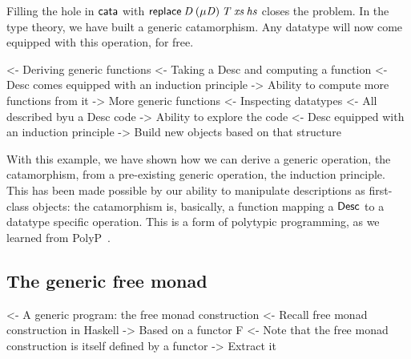 %
Filling the hole in $\F{cata}$ with \(\F{replace}\: \V{D}\:
(\Mu{\V{D}})\: \V{T}\: \V{xs}\: \V{hs}\) closes the problem. In the
type theory, we have built a generic catamorphism. Any datatype will
now come equipped with this operation, for free.


\begin{wstructure}
<- Deriving generic functions
    <- Taking a Desc and computing a function
        <- Desc comes equipped with an induction principle
        -> Ability to compute more functions from it
            -> More generic functions
    <- Inspecting datatypes
        <- All described byu a Desc code
        -> Ability to explore the code
            <- Desc equipped with an induction principle
            -> Build new objects based on that structure
\end{wstructure}

With this example, we have shown how we can derive a generic
operation, the catamorphism, from a pre-existing generic operation,
the induction principle. This has been made possible by our ability to
manipulate descriptions as first-class objects: the catamorphism is,
basically, a function mapping a $\Desc$ to a datatype specific
operation. This is a form of polytypic programming, as we learned from
PolyP~\cite{jansson:polyp}.


\subsection{The generic free monad}
\label{sec:desc-free-monad}

\begin{wstructure}
<- A generic program: the free monad construction
    <- Recall free monad construction in Haskell
        -> Based on a functor F
    <- Note that the free monad construction is itself defined by a functor
        -> Extract it
\end{wstructure}

